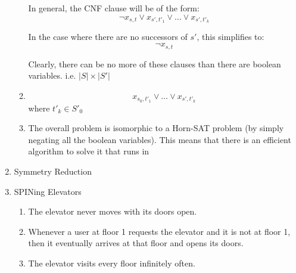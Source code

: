 \documentclass{article}
\begin{document}
\begin{enumerate}
\begin{enumerate}
      In general, the CNF clause will be of the form:
      \[ \neg x_{s,t} \vee x_{s',t'_1} \vee \dots \vee x_{s',t'_k} \]

      In the case where there are no successors of $s'$, this simplifies to:
      \[ \neg x_{s,t} \]

      Clearly, there can be no more of these clauses than there are boolean
      variables. i.e. $|S| \times |S'|$
    \item
      \[ x_{s_0,t'_1} \vee \dots \vee x_{s',t'_k} \]
      where $t'_k \in S'_0$
    \item The overall problem is isomorphic to a Horn-SAT problem
      (by simply negating all the boolean variables).  This means that there
      is an efficient algorithm to solve it that runs in
  \end{enumerate}
\item Symmetry Reduction
\item SPINing Elevators
  \begin{enumerate}
    \item The elevator never moves with its doors open.
    \item Whenever a user at floor 1 requests the elevator and it is not at floor 1, then it eventually arrives at that floor and opens its doors.
    \item The elevator visits every floor infinitely often.
  \end{enumerate}
\end{enumerate}

%
%
\end{document}
